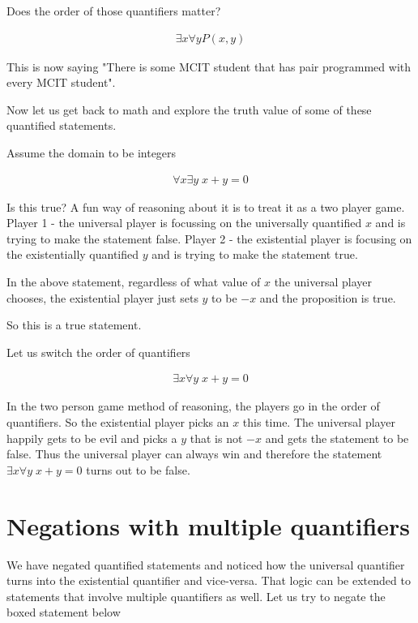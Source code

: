 \documentclass[12pt]{article}
\begin{document}
Does the order of those quantifiers matter?

\begin{align*}
\exists x \forall y P(x,y)
\end{align*}

This is now saying "There is some MCIT student that has pair programmed with every MCIT student".

Now let us get back to math and explore the truth value of some of these quantified statements.

Assume the domain to be integers

\begin{align*}
\forall x \exists y \; x + y = 0
\end{align*}

Is this true? A fun way of reasoning about it is to treat it as a two player game. Player 1 - the universal player is focussing on the universally quantified $x$ and is trying to make the statement false. Player 2 - the existential player is focusing on the existentially quantified $y$ and is trying to make the statement true.

In the above statement, regardless of what value of $x$ the universal player chooses, the existential player just sets $y$ to be $-x$ and the proposition is true. 

So this is a true statement.

Let us switch the order of quantifiers

\begin{align*}
\exists x \forall y \; x + y = 0
\end{align*}

In the two person game method of reasoning, the players go in the order of quantifiers. So the existential player picks an $x$ this time. The universal player happily gets to be evil and picks a $y$ that is not $-x$ and gets the statement to be false. Thus the universal player can always win and therefore the statement $\exists x \forall y \; x + y = 0$ turns out to be false.

\section*{Negations with multiple quantifiers}

We have negated quantified statements and noticed how the universal quantifier turns into the existential quantifier and vice-versa. That logic can be extended to statements that involve multiple quantifiers as well. Let us try to negate the boxed statement below
\end{document}
